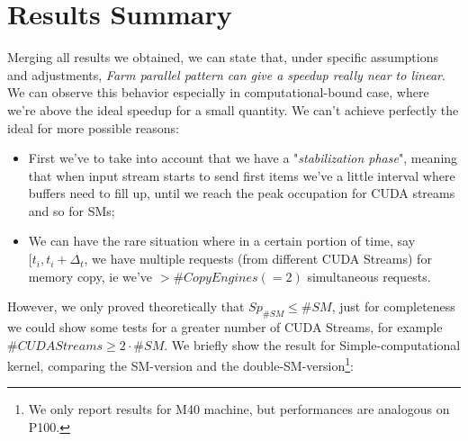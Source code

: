 \section{Results Summary}
Merging all results we obtained, we can state that, under specific assumptions and adjustments, \textit{Farm parallel pattern can give a speedup really near to linear}.\\
We can observe this behavior especially in computational-bound case, where we're above the ideal speedup for a small quantity. We can't achieve perfectly the ideal for more possible reasons: 
\begin{itemize}
	\item First we've to take into account that we have a "\textit{stabilization phase}", meaning that when input stream starts to send first items we've a little interval where buffers need to fill up, until we reach the peak occupation for CUDA streams and so for SMs;
	\item We can have the rare situation where in a certain portion of time, say \([t_{i},t_{i}+\Delta_{t}\), we have multiple requests (from different CUDA Streams) for memory copy, ie we've \(>\#Copy Engines (=2)\) simultaneous requests.\\
\end{itemize}
However, we only proved theoretically that \(Sp_{\#SM} \leq \#SM\), just for completeness we could show some tests for a greater number of CUDA Streams, for example\\ \(\#CUDA Streams \geq 2\cdot\#SM\).
We briefly show the result for Simple-computational kernel, comparing the SM-version and the double-SM-version\footnote{We only report results for M40 machine, but performances are analogous on P100.}:



